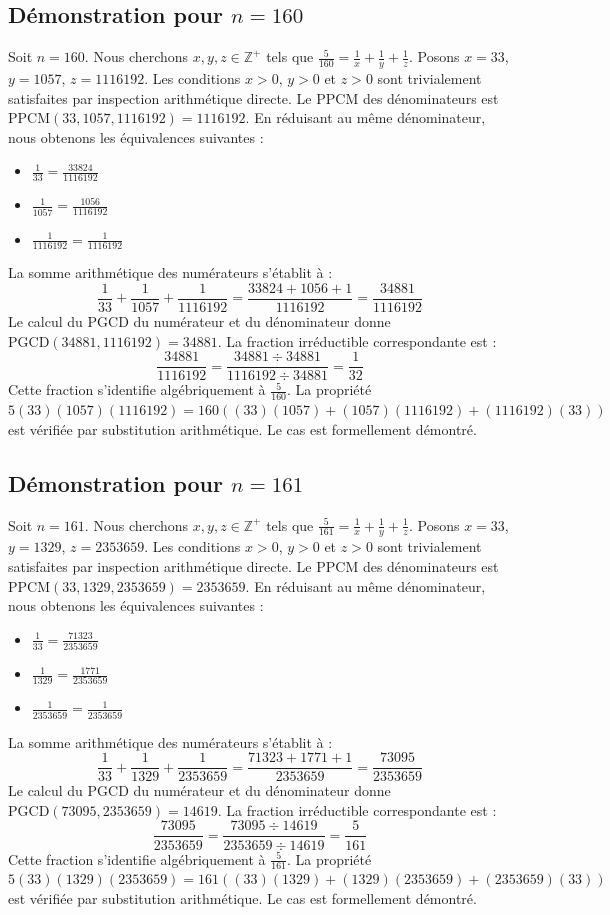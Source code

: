 \documentclass[12pt,a4paper]{article}
\begin{document}
\subsection{Démonstration pour $n = 160$}
Soit $n = 160$. Nous cherchons $x, y, z \in \mathbb{Z}^{+}$ tels que $\frac{5}{160} = \frac{1}{x} + \frac{1}{y} + \frac{1}{z}$.
Posons $x = 33$, $y = 1057$, $z = 1116192$.
Les conditions $x > 0$, $y > 0$ et $z > 0$ sont trivialement satisfaites par inspection arithmétique directe.
Le PPCM des dénominateurs est $\text{PPCM}(33, 1057, 1116192) = 1116192$.
En réduisant au même dénominateur, nous obtenons les équivalences suivantes :
\begin{itemize}
    \item $\frac{1}{33} = \frac{33824}{1116192}$
    \item $\frac{1}{1057} = \frac{1056}{1116192}$
    \item $\frac{1}{1116192} = \frac{1}{1116192}$
\end{itemize}
La somme arithmétique des numérateurs s'établit à :
$$ \frac{1}{33} + \frac{1}{1057} + \frac{1}{1116192} = \frac{33824 + 1056 + 1}{1116192} = \frac{34881}{1116192} $$
Le calcul du PGCD du numérateur et du dénominateur donne $\text{PGCD}(34881, 1116192) = 34881$.
La fraction irréductible correspondante est :
$$ \frac{34881}{1116192} = \frac{34881 \div 34881}{1116192 \div 34881} = \frac{1}{32} $$
Cette fraction s'identifie algébriquement à $\frac{5}{160}$.
La propriété $5(33)(1057)(1116192) = 160((33)(1057) + (1057)(1116192) + (1116192)(33))$ est vérifiée par substitution arithmétique.
Le cas est formellement démontré.

\subsection{Démonstration pour $n = 161$}
Soit $n = 161$. Nous cherchons $x, y, z \in \mathbb{Z}^{+}$ tels que $\frac{5}{161} = \frac{1}{x} + \frac{1}{y} + \frac{1}{z}$.
Posons $x = 33$, $y = 1329$, $z = 2353659$.
Les conditions $x > 0$, $y > 0$ et $z > 0$ sont trivialement satisfaites par inspection arithmétique directe.
Le PPCM des dénominateurs est $\text{PPCM}(33, 1329, 2353659) = 2353659$.
En réduisant au même dénominateur, nous obtenons les équivalences suivantes :
\begin{itemize}
    \item $\frac{1}{33} = \frac{71323}{2353659}$
    \item $\frac{1}{1329} = \frac{1771}{2353659}$
    \item $\frac{1}{2353659} = \frac{1}{2353659}$
\end{itemize}
La somme arithmétique des numérateurs s'établit à :
$$ \frac{1}{33} + \frac{1}{1329} + \frac{1}{2353659} = \frac{71323 + 1771 + 1}{2353659} = \frac{73095}{2353659} $$
Le calcul du PGCD du numérateur et du dénominateur donne $\text{PGCD}(73095, 2353659) = 14619$.
La fraction irréductible correspondante est :
$$ \frac{73095}{2353659} = \frac{73095 \div 14619}{2353659 \div 14619} = \frac{5}{161} $$
Cette fraction s'identifie algébriquement à $\frac{5}{161}$.
La propriété $5(33)(1329)(2353659) = 161((33)(1329) + (1329)(2353659) + (2353659)(33))$ est vérifiée par substitution arithmétique.
Le cas est formellement démontré.
\end{document}
